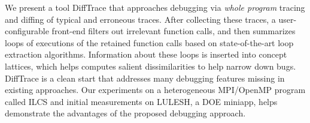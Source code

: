We present a tool
DiffTrace that approaches debugging via {\em whole program} tracing and
diffing of typical and erroneous traces.
%
After collecting these traces,
a user-configurable front-end filters out irrelevant function calls,
and then summarizes loops of executions of the retained function
calls based on state-of-the-art loop extraction algorithms.
%
Information about these loops is inserted 
into concept lattices, which helps
computes salient dissimilarities to help narrow down bugs.
%
DiffTrace is a clean start that addresses many
debugging features missing in existing approaches.
%
Our experiments on a heterogeneous MPI/OpenMP program called
ILCS and initial measurements on LULESH, a DOE miniapp,
helps demonstrate the advantages of the proposed debugging approach.







